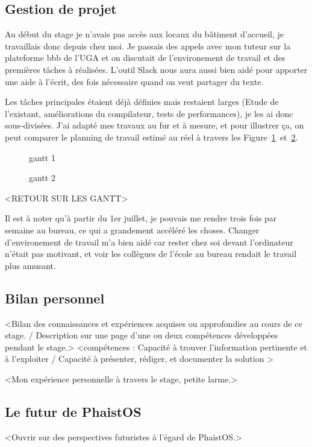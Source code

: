 \subsection{Gestion de projet}

Au début du stage je n'avais pas accès aux locaux du bâtiment d'accueil, je travaillais donc depuis chez moi. Je passais des appels avec mon tuteur sur la plateforme bbb de l'UGA et on discutait de l'environement de travail et des premières tâches à réalisées. L'outil Slack nous aura aussi bien aidé pour apporter une aide à l'écrit, des fois nécessaire quand on veut partager du texte.

Les tâches principales étaient déjà définies mais restaient larges (Etude de l'existant, améliorations du compilateur, tests de performances), je les ai donc sous-divisées. J'ai adapté mes travaux au fur et à mesure, et pour illustrer ça, on peut comparer le planning de travail estimé au réel à travers les Figure~\ref{fig:gantt_1}~et~\ref{fig:gantt_2}.

\begin{figure}[h!t] \centering
    \caption{gantt 1}
    \label{fig:gantt_1}
\end{figure}

\begin{figure}[h!t] \centering
    \caption{gantt 2}
    \label{fig:gantt_2}
\end{figure}

<RETOUR SUR LES GANTT>

Il est à noter qu'à partir du 1er juillet, je pouvais me rendre trois fois par semaine au bureau, ce qui a grandement accéléré les choses. Changer d'environement de travail m'a bien aidé car rester chez soi devant l'ordinateur n'était pas motivant, et voir les collègues de l'école au bureau rendait le travail plus amusant.

\subsection{Bilan personnel}

<Bilan des connaissances et expériences acquises ou approfondies au cours de ce stage. / Description sur une page d'une ou deux compétences développées pendant le stage.>
<compétences : Capacité à trouver l'information pertinente et à l'exploiter  / Capacité à présenter, rédiger, et documenter la solution >

<Mon expérience personnelle à travers le stage, petite larme.>

\subsection{Le futur de PhaistOS}

<Ouvrir sur des perspectives futuristes à l'égard de PhaistOS.>